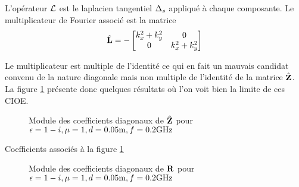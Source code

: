     L'opérateur \(\mathcal{L}\) est le laplacien tangentiel \(\Delta_s\) appliqué à chaque composante. Le multiplicateur de Fourier associé est la matrice
    \begin{equation}
      \hat{\mathbf{L}}  = -
      \begin{bmatrix}
        k_x^2 + k_y^2 & 0
        \\
        0 & k_x^2 + k_y^2
      \end{bmatrix}
    \end{equation}

    Le multiplicateur est multiple de l'identité ce qui en fait un mauvais candidat convenu de la nature diagonale mais non multiple de l’identité de la matrice \(\hat{\mathbf{Z}}\). La figure \ref{fig:imp_fourier:plan:stupfel:hoibc} présente donc quelques résultats où l'on voit bien la limite de ces CIOE.
    \begin{figure}[!hbt]
      \centering
      
      \caption[CIOE sur empilement de B.~Stupfel p.~1661]{Module des coefficients diagonaux de \(\hat{\mathbf{Z}}\) pour \(\epsilon = 1-i, \mu = 1, d=0.05\text{m}, f=0.2\text{GHz}\)}
      \label{fig:imp_fourier:plan:stupfel:hoibc}
    \end{figure}
    \begin{table}[!hbt]
      \centering

      \caption{Coefficients associés à la figure \ref{fig:imp_fourier:plan:stupfel:hoibc}}
      \label{tab:imp_fourier:plan:stupfel:hoibc}
    \end{table}
    
    \begin{figure}[!hbt]
      \centering
      
      \caption[CIOE sur empilement de B.~Stupfel p.~1661]{Module des coefficients diagonaux de \(\mathbf{R}\) pour \(\epsilon = 1-i, \mu = 1, d=0.05\text{m}, f=0.2\text{GHz}\)}
      \label{fig:reflex_fourier:plan:stupfel:hoibc}
    \end{figure}
